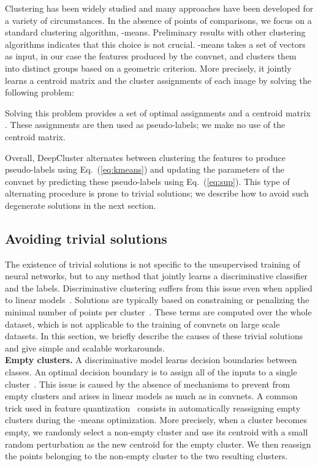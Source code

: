 \documentclass[runningheads]{llncs}
\def\OURS{DeepCluster\xspace}
\begin{document}
Clustering has been widely studied and many approaches have been developed for a variety of circumstances. In the absence of points of comparisons,
we focus on a standard clustering algorithm, -means. Preliminary results with other clustering algorithms indicates that this choice is not crucial.
-means takes a set of vectors as input, in our case the features  produced by the convnet, and clusters them into  distinct groups based on a geometric criterion.
More precisely, it jointly learns a  centroid matrix  and the cluster assignments  of each image  by solving the following problem:

Solving this problem provides a set of optimal assignments  and a centroid matrix .
These assignments are then used as pseudo-labels; we make no use of the centroid matrix.

Overall, \OURS alternates between clustering the features to produce pseudo-labels using Eq.~(\ref{eq:kmeans})
and updating the parameters of the convnet by predicting these pseudo-labels using Eq.~(\ref{eq:sup}).
This type of alternating procedure is prone to trivial solutions; we describe how to avoid such degenerate solutions in the next section.


\subsection{Avoiding trivial solutions}
The existence of trivial solutions is not specific to the unsupervised training of neural networks, but to any method that jointly learns a discriminative classifier and the labels.
Discriminative clustering suffers from this issue even when applied to linear models~\cite{xu2005maximum}.
Solutions are typically based on constraining or penalizing the minimal number of points per cluster~\cite{bach2008diffrac,joulin2012convex}.
These terms are computed over the whole dataset, which is not applicable to the training of convnets on large scale datasets.
In this section, we briefly describe the causes of these trivial solutions and give simple and scalable workarounds.
\\

\noindent\textbf{Empty clusters.}
A discriminative model learns decision boundaries between classes.
An optimal decision boundary is to assign all of the inputs to a single cluster~\cite{xu2005maximum}.
This issue is caused by the absence of mechanisms to prevent from empty clusters and arises in linear models as much as in convnets.
A common trick used in feature quantization~\cite{johnson2017billion} consists in automatically reassigning empty clusters during the -means optimization.
More precisely, when a cluster becomes empty, we randomly select a non-empty cluster and use its centroid with a small random perturbation as the new centroid for the empty cluster.
We then reassign the points belonging to the non-empty cluster to the two resulting clusters.
\\
\end{document}
